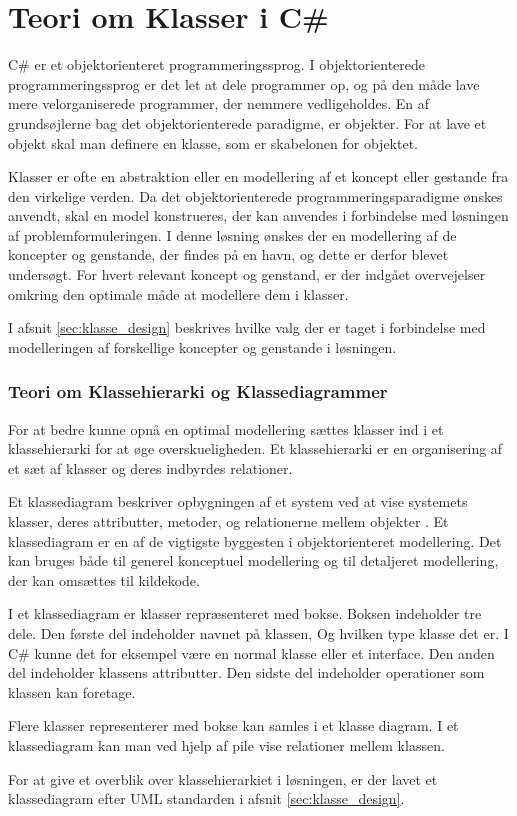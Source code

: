 \section{Teori om Klasser i C\#}
\label{sec:klasse_teori}

C\# er et objektorienteret programmeringssprog. I objektorienterede programmeringssprog er det let at dele programmer op, og på den måde lave mere velorganiserede programmer, der nemmere vedligeholdes. En af grundsøjlerne bag det objektorienterede paradigme, er objekter. For at lave et objekt skal man definere en klasse, som er skabelonen for objektet. 

Klasser er ofte en abstraktion eller en modellering af et koncept eller gestande fra den virkelige verden. Da det objektorienterede programmeringsparadigme ønskes anvendt, skal en model konstrueres, der kan anvendes i forbindelse med løsningen af problemformuleringen. I denne løsning ønskes der en modellering af de koncepter og genstande, der findes på en havn, og dette er derfor blevet undersøgt. For hvert relevant koncept og genstand, er der indgået overvejelser omkring den optimale måde at modellere dem i klasser.

I afsnit \cref{sec:klasse_design} beskrives hvilke valg der er taget i forbindelse med modelleringen af forskellige koncepter og genstande i løsningen.

\subsubsection{Teori om Klassehierarki og Klassediagrammer}
\label{sub:uml_teori}


For at bedre kunne opnå en optimal modellering sættes klasser ind i et klassehierarki for at øge overskueligheden. Et klassehierarki er en organisering af et sæt af klasser og deres indbyrdes relationer.

Et klassediagram beskriver opbygningen af et system ved at vise systemets klasser, deres attributter, metoder, og relationerne mellem objekter \cite{martin2006agile}. Et klassediagram er en af de vigtigste byggesten i objektorienteret modellering. Det kan bruges både til generel konceptuel modellering og til detaljeret modellering, der kan omsættes til kildekode. 

I et klassediagram er klasser repræsenteret med bokse. Boksen indeholder tre dele. Den første del indeholder navnet på klassen, Og hvilken type klasse det er. I C\# kunne det for eksempel være en normal klasse eller et interface. Den anden del indeholder klassens attributter. Den sidste del indeholder operationer som klassen kan foretage.

Flere klasser representerer med bokse kan samles i et klasse diagram. I et klassediagram kan man ved hjelp af pile vise relationer mellem klassen.

For at give et overblik over klassehierarkiet i løsningen, er der lavet et klassediagram efter UML standarden i afsnit \cref{sec:klasse_design}.



